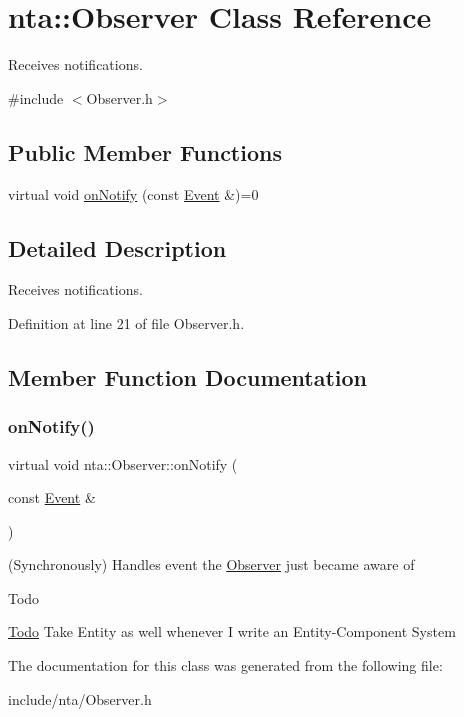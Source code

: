 \hypertarget{classnta_1_1Observer}{}\section{nta\+:\+:Observer Class Reference}
\label{classnta_1_1Observer}


Receives notifications.  




{\ttfamily \#include $<$Observer.\+h$>$}

\subsection*{Public Member Functions}
\begin{DoxyCompactItemize}
\item 
virtual void \hyperlink{classnta_1_1Observer_a828574b2ddb58a600311d2da9c6cd0a5}{on\+Notify} (const \hyperlink{structnta_1_1Event}{Event} \&)=0
\end{DoxyCompactItemize}


\subsection{Detailed Description}
Receives notifications. 

Definition at line 21 of file Observer.\+h.



\subsection{Member Function Documentation}
\mbox{\label{classnta_1_1Observer_a828574b2ddb58a600311d2da9c6cd0a5}} 
\subsubsection{\texorpdfstring{on\+Notify()}{onNotify()}}
{\footnotesize\ttfamily virtual void nta\+::\+Observer\+::on\+Notify (\begin{DoxyParamCaption}\item[{const \hyperlink{structnta_1_1Event}{Event} \&}]{ }\end{DoxyParamCaption})\hspace{0.3cm}{\ttfamily [pure virtual]}}

(Synchronously) Handles event the \hyperlink{classnta_1_1Observer}{Observer} just became aware of \begin{DoxyRefDesc}{Todo}
\item[\hyperlink{todo__todo000010}{Todo}]Take Entity as well whenever I write an Entity-\/\+Component System \end{DoxyRefDesc}


The documentation for this class was generated from the following file\+:\begin{DoxyCompactItemize}
\item 
include/nta/Observer.\+h\end{DoxyCompactItemize}
